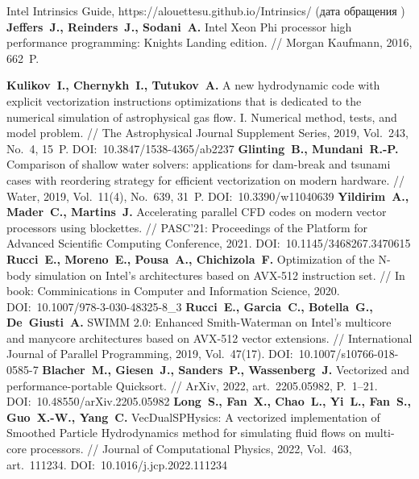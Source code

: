 \begin{thebibliography}{99}
Intel Intrinsics Guide, https://alouettesu.github.io/Intrinsics/ (дата обращения \StrDate)
\textbf{Jeffers~J., Reinders~J., Sodani~A.} Intel Xeon Phi processor high performance programming: Knights Landing edition. // Morgan Kaufmann, 2016, 662~P.

\textbf{Kulikov~I., Chernykh~I., Tutukov~A.} A new hydrodynamic code with explicit vectorization instructions optimizations that is dedicated to the numerical simulation of astrophysical gas flow. I. Numerical method, tests, and model problem. // The Astrophysical Journal Supplement Series, 2019, Vol.~243, No.~4, 15~P. DOI:~10.3847/1538-4365/ab2237
\textbf{Glinting~B., Mundani~R.-P.} Comparison of shallow water solvers: applications for dam-break and tsunami cases with reordering strategy for efficient vectorization on modern hardware. // Water, 2019, Vol.~11(4), No.~639, 31~P. DOI:~10.3390/w11040639
\textbf{Yildirim~A., Mader~C., Martins~J.} Accelerating parallel CFD codes on modern vector processors using blockettes. // PASC’21: Proceedings of the Platform for Advanced Scientific Computing Conference, 2021. DOI:~10.1145/3468267.3470615
\textbf{Rucci~E., Moreno~E., Pousa~A., Chichizola~F.} Optimization of the N-body simulation on Intel’s architectures based on AVX-512 instruction set. // In book: Comminications in Computer and Information Science, 2020. DOI:~10.1007/978-3-030-48325-8\_3
\textbf{Rucci~E., Garcia~C., Botella~G., De~Giusti~A.} SWIMM 2.0: Enhanced Smith-Waterman on Intel’s multicore and manycore architectures based on AVX-512 vector extensions. // International Journal of Parallel Programming, 2019, Vol.~47(17). DOI:~10.1007/s10766-018-0585-7
\textbf{Blacher~M., Giesen~J., Sanders~P., Wassenberg~J.} Vectorized and performance-portable Quicksort. // ArXiv, 2022, art.~2205.05982, P.~1–21. DOI:~10.48550/arXiv.2205.05982
\textbf{Long~S., Fan~X., Chao~L., Yi~L., Fan~S., Guo~X.-W., Yang~C.} VecDualSPHysics: A vectorized implementation of Smoothed Particle Hydrodynamics method for simulating fluid flows on multi-core processors. // Journal of Computational Physics, 2022, Vol.~463, art.~111234. DOI:~10.1016/j.jcp.2022.111234

\end{thebibliography}
